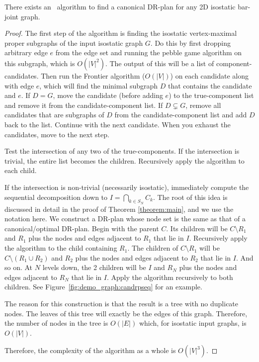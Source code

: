 \begin{theorem}\label{theorem:algo_complexity}
    There exists an \candrpcomplexityv\ algorithm to find a canonical DR-plan for any 2D isostatic bar-joint graph.
\end{theorem}

\begin{proof}
The first step of the algorithm is finding the isostatic vertex-maximal proper subgraphs of the input isostatic graph $G$. Do this by first dropping arbitrary edge $e$ from the edge set and running the pebble game algorithm \cite{Jacobs:1997:PG} on this subgraph, which is $O(|V|^2)$. The output of this will be a list of component-candidates. Then run the Frontier algorithm \cite{hoffman2001decompositionII} \cite{lomonosov2004graph} ($O(|V|)$) on each candidate along with edge $e$, which will find the minimal subgraph $D$ that contains the candidate and $e$. If $D=G$, move the candidate (before adding $e$) to the true-component list and remove it from the candidate-component list. If $D\subsetneq G$, remove all candidates that are subgraphs of $D$ from the candidate-component list and add $D$ back to the list. Continue with the next candidate. When you exhaust the candidates, move to the next step.

Test the intersection of any two of the true-components. If the intersection is trivial, the entire list becomes the children. Recursively apply the algorithm to each child.

If the intersection is non-trivial (necessarily isostatic), immediately compute the sequential decomposition down to $I=\bigcap_{k\in S_N}{C_k}$. The root of this idea is discussed in detail in the proof of Theorem \ref{theorem:main}, and we use the notation here. We construct a DR-plan whose node set is the same as that of a canonical/optimal DR-plan. Begin with the parent $C$. Its children will be $C\setminus R_1$ and $R_1$ plus the nodes and edges adjacent to $R_1$ that lie in $I$. Recursively apply the algorithm to the child containing $R_1$. The children of $C\setminus R_1$ will be $C\setminus (R_1\cup R_2)$ and $R_2$ plus the nodes and edges adjacent to $R_2$ that lie in $I$. And so on. At $N$ levels down, the 2 children will be $I$ and $R_N$ plus the nodes and edges adjacent to $R_N$ that lie in $I$. Apply the algorithm recursively to both children. See Figure~\ref{fig:demo_graph:candrpseq} for an example.

The reason for this construction is that the result is a tree with no duplicate nodes. The leaves of this tree will exactly be the edges of this graph. Therefore, the number of nodes in the tree is $O(|E|)$ which, for isostatic input graphs, is $O(|V|)$.

Therefore, the complexity of the algorithm as a whole is $O(|V|^3)$.
%
\end{proof}


